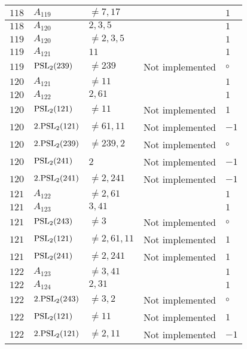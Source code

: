 \documentclass[a4paper, 11pt]{article}
\begin{document}
\begin{longtable}{lllll}
        $ 118 $ & $ A_{119} $ & $ \neq 7, 17 $ & $ ~ $ & $ 1  $ \\ \hline
        $ 118 $ & $ A_{120} $ & $ 2, 3, 5 $ & $ ~ $ & $ 1  $ \\ \hline
        $ 119 $ & $ A_{120} $ & $ \neq 2, 3, 5 $ & $ ~ $ & $ 1  $ \\ \hline
        $ 119 $ & $ A_{121} $ & $ 11 $ & $ ~ $ & $ 1  $ \\ \hline
        $ 119 $ & $ {\rm PSL}_{2}(239) $ & $ \neq 239 $ & Not implemented & $\circ$ \\ \hline
        $ 120 $ & $ A_{121} $ & $ \neq 11 $ & $ ~ $ & $ 1  $ \\ \hline
        $ 120 $ & $ A_{122} $ & $ 2, 61 $ & $ ~ $ & $ 1  $ \\ \hline
        $ 120 $ & $ {\rm PSL}_{2}(121) $ & $ \neq 11 $ & Not implemented & $ 1  $ \\ \hline
        $ 120 $ & $ 2.{\rm PSL}_{2}(121) $ & $ \neq 61, 11 $ & Not implemented & $ -1  $ \\ \hline
        $ 120 $ & $ 2.{\rm PSL}_{2}(239) $ & $ \neq 239, 2 $ & Not implemented & $\circ$ \\ \hline
        $ 120 $ & $ {\rm PSL}_{2}(241) $ & $ 2 $ & Not implemented & $ -1  $ \\ \hline
        $ 120 $ & $ 2.{\rm PSL}_{2}(241) $ & $ \neq 2, 241 $ & Not implemented & $ -1  $ \\ \hline
        $ 121 $ & $ A_{122} $ & $ \neq 2, 61 $ & $ ~ $ & $ 1  $ \\ \hline
        $ 121 $ & $ A_{123} $ & $ 3, 41 $ & $ ~ $ & $ 1  $ \\ \hline
        $ 121 $ & $ {\rm PSL}_{2}(243) $ & $ \neq 3 $ & Not implemented & $\circ$ \\ \hline
        $ 121 $ & $ {\rm PSL}_{2}(121) $ & $ \neq 2, 61, 11 $ & Not implemented & $ 1  $ \\ \hline
        $ 121 $ & $ {\rm PSL}_{2}(241) $ & $ \neq 2, 241 $ & Not implemented & $ 1  $ \\ \hline
        $ 122 $ & $ A_{123} $ & $ \neq 3, 41 $ & $ ~ $ & $ 1  $ \\ \hline
        $ 122 $ & $ A_{124} $ & $ 2, 31 $ & $ ~ $ & $ 1  $ \\ \hline
        $ 122 $ & $ 2.{\rm PSL}_{2}(243) $ & $ \neq 3, 2 $ & Not implemented & $\circ$ \\ \hline
        $ 122 $ & $ {\rm PSL}_{2}(121) $ & $ \neq 11 $ & Not implemented & $ 1  $ \\ \hline
        $ 122 $ & $ 2.{\rm PSL}_{2}(121) $ & $ \neq 2, 11 $ & Not implemented & $ -1  $ \\ \hline

\end{longtable}
\end{document}

